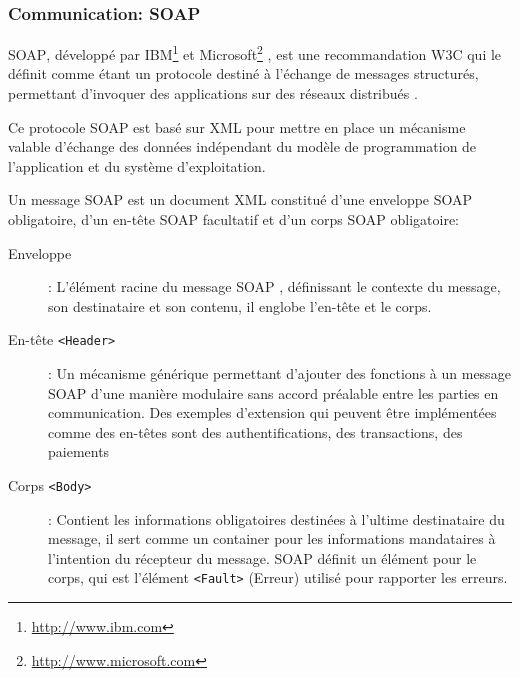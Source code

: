 	\subsubsection{Communication: SOAP}
		\textsc{SOAP}, développé par IBM\footnote{\url{http://www.ibm.com}} et
		Microsoft\footnote{\url{http://www.microsoft.com}} \cite{box2000simple}, est une recommandation \textsc{W3C} 
		qui le définit comme étant un protocole destiné à l'échange de messages structurés, permettant 
		d'invoquer des applications sur des réseaux distribués \cite{mitra2003soap}.

		Ce protocole \textsc{SOAP} est basé sur \textsc{XML} pour mettre en place un mécanisme valable
		d'échange des données indépendant du modèle de programmation de l'application et du système
		d’exploitation.

	      	Un message \textsc{SOAP} est un document XML constitué d'une enveloppe \textsc{SOAP} obligatoire, 
		d'un en-tête \textsc{SOAP} facultatif et d'un corps \textsc{SOAP} obligatoire:



		\SpecialItem
		\begin{description} %
		    \item[Enveloppe]:  
			L'élément racine du message \textsc{SOAP} , définissant le contexte du message, son
		       destinataire et son contenu, il englobe l'en-tête et le corps.

		    \item[En-tête \texttt{<Header>}]:
		       	Un mécanisme générique permettant d'ajouter des fonctions à un message
			\textsc{SOAP} d'une manière modulaire sans accord préalable entre les parties en communication. 
			Des exemples d'extension qui peuvent être implémentées comme des en-têtes sont des 
			authentifications, des transactions, des paiements

		    \item[Corps \texttt{<Body>}]: 
			Contient les informations obligatoires destinées à l'ultime destinataire du message, il sert 
			comme un container pour les informations mandataires à l'intention du récepteur du message.
			\textsc{SOAP} définit un élément pour le corps, qui est l'élément \texttt{<Fault>} (Erreur) 
			utilisé pour rapporter les erreurs.
		\end{description}

